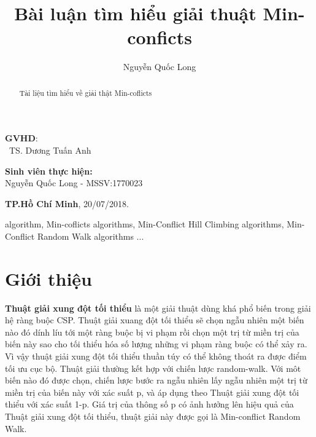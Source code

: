 \documentclass{hcmutarticle}
\begin{document}
\vspace{2cm}

\begin{minipage}[t]{0.60\linewidth}
\textbf{GVHD}: \\
\ TS. Dương Tuấn Anh
\end{minipage}
\begin{minipage}[t]{0.40\linewidth}
\textbf{Sinh viên thực hiện:}\\
Nguyễn Quốc Long - MSSV:1770023
\end{minipage}

\vspace{3cm}

\begin{center}

\textbf{TP.Hồ Chí Minh},
20/07/2018.

\end{center}



\newpage

\tableofcontents 

\newpage

\title{Bài luận tìm hiểu giải thuật Min-conficts}

\author{  Nguyễn Quốc Long} 





\maketitle



\begin{abstract}
Tài liệu tìm hiểu về giải thật Min-coflicts


\end{abstract}

\begin{keywords}
algorithm, Min-coflicts algorithms, Min-Conflict Hill Climbing algorithms, Min-Conflict Random Walk algorithms ...
\end{keywords} 


\section{Giới thiệu}

\textbf{Thuật giải xung đột tối thiểu} 
 là một giải thuật dùng khá phổ biến trong giải hệ ràng buộc CSP. Thuật giải xuang đột tối thiểu sẽ chọn ngẫu nhiên một biến nào đó dính líu tới một ràng buộc bị vi phạm rồi chọn một trị từ miền trị của biến này sao cho tối thiểu hóa số lượng những vi phạm ràng buộc có thể xảy ra. Vì vậy thuật giải xung đột tối thiểu thuần túy có thể không thoát ra được điểm tối ưu cục bộ. Thuật giải thường kết hợp với chiến lược random-walk. Với môt biến nào đó được chọn, chiến lược bước ra ngẫu nhiên lấy ngẫu nhiên một trị từ miền trị của biến này với xác suất p, và áp dụng theo Thuật giải xung đột tối thiểu với xác suất 1-p. Giá trị của thông số p có ảnh hưởng lên hiệu quả của Thuật giải xung đột tối thiểu, thuật giải này được gọi là Min-conflict Random Walk.
\end{document}
